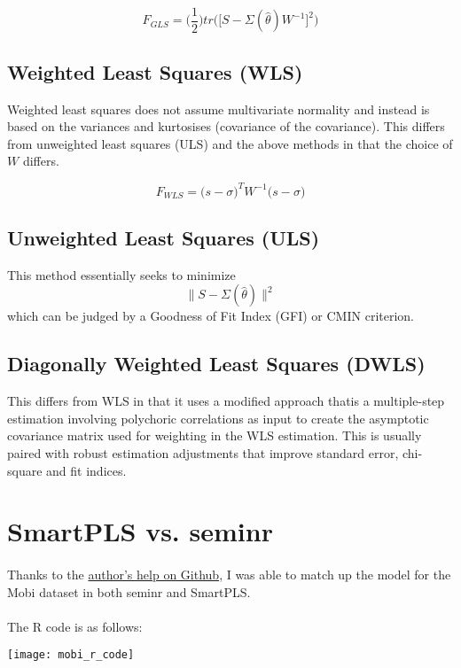 \documentclass{article}
\begin{document}
$$F_{GLS} = \bigg(\frac{1}{2} \bigg) tr \Big( \big[S - \Sigma(\hat{\theta}) W^{-1} \big]^2 \Big)$$

\subsection{Weighted Least Squares (WLS)}
Weighted least squares does not assume multivariate normality and instead is based on the variances and kurtosises (covariance of the covariance). This differs from unweighted least squares (ULS) and the above methods in that the choice of $W$ differs.

$$F_{WLS} = \big( s - \sigma \big)^T W^{-1} \big( s - \sigma \big) $$

\subsection{Unweighted Least Squares (ULS)}
This method essentially seeks to minimize $$ \| S - \Sigma(\hat{\theta}) \|^2$$
which can be judged by a Goodness of Fit Index (GFI) or CMIN criterion.


\subsection{Diagonally Weighted Least Squares (DWLS)}
This differs from WLS in that it uses a modified approach thatis a multiple-step estimation involving polychoric correlations as input to create the asymptotic covariance matrix used for weighting in the WLS estimation. This is usually paired with robust estimation adjustments that improve standard error, chi-square and fit indices.

\section{SmartPLS vs. seminr}

\paragraph{}
Thanks to the \href{https://github.com/sem-in-r/seminr/issues/131}{author's help on Github}, I was able to match up the model for the Mobi dataset in both seminr and SmartPLS.

\paragraph{}
The R code is as follows:

\texttt{[image: mobi\_r\_code]}
\end{document}
